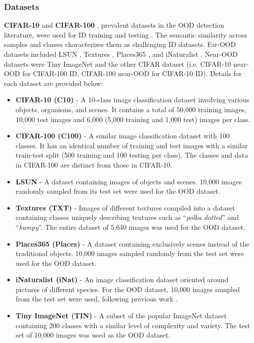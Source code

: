 \subsubsection{Datasets}
\textbf{CIFAR-10} and \textbf{CIFAR-100} \cite{krizhevsky2009learning}, prevalent datasets in the OOD detection literature, were used for ID training and testing \cite{yang2022openood}. The semantic similarity across samples and classes characterizes them as challenging ID datasets. Far-OOD datasets included LSUN \cite{yu2015lsun}, Textures \cite{cimpoi2014describing}, Places365 \cite{zhou2017places}, and iNaturalist \cite{van2018inaturalist}. Near-OOD datasets were Tiny ImageNet \cite{le2015tiny} and the other CIFAR dataset (i.e. CIFAR-10 near-OOD for CIFAR-100 ID, CIFAR-100 near-OOD for CIFAR-10 ID). Details for each dataset are provided below:
\begin{itemize}
\item \textbf{CIFAR-10 (C10)} \cite{krizhevsky2009learning} - A 10-class image classification dataset involving various objects, organisms, and scenes. It contains a total of 50,000 training images, 10,000 test images and 6,000 (5,000 training and 1,000 test) images per class. 
\item \textbf{CIFAR-100 (C100)} \cite{krizhevsky2009learning} - A similar image classification dataset with 100 classes. It has an identical number of training and test images with a similar train-test split (500 training and 100 testing per class). The classes and data in CIFAR-100 are distinct from those in CIFAR-10.
\item \textbf{LSUN} \cite{yu2015lsun} - A dataset containing images of objects and scenes. 10,000 images randomly sampled from its test set were used for the OOD dataset. 
\item \textbf{Textures (TXT)} \cite{cimpoi2014describing} - Images of different textures compiled into a dataset containing classes uniquely describing textures such as ``\textit{polka dotted}'' and ``\textit{bumpy}''. The entire dataset of 5,640 images was used for the OOD dataset.
\item \textbf{Places365 (Places)} \cite{zhou2017places} - A dataset containing exclusively scenes instead of the traditional objects. 10,000 images sampled randomly from the test set were used for the OOD dataset.
\item \textbf{iNaturalist (iNat)} \cite{van2018inaturalist} - An image classification dataset oriented around pictures of different species. For the OOD dataset, 10,000 images sampled from the test set were used, following previous work \cite{yang2022openood}.
\item \textbf{Tiny ImageNet (TIN)} \cite{le2015tiny} - A subset of the popular ImageNet dataset \cite{krizhevsky2012imagenet} containing 200 classes with a similar level of complexity and variety. The test set of 10,000 images was used as the OOD dataset.
\end{itemize}

